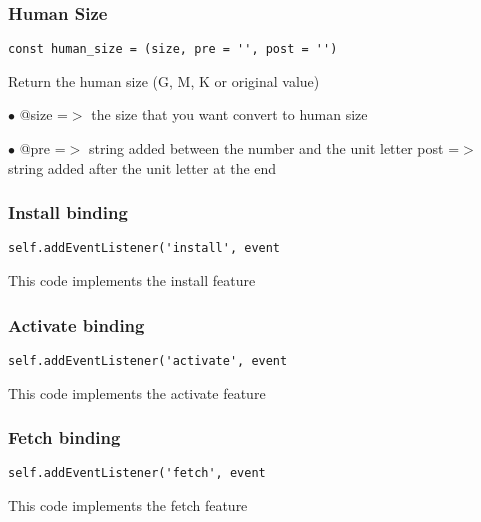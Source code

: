 \documentclass[a4paper]{article}
\begin{document}
\hypertarget{toc829}{}
\subsubsection{Human Size}

\begin{lstlisting}
const human_size = (size, pre = '', post = '')
\end{lstlisting}

Return the human size (G, M, K or original value)

\begin{compactitem}
\item[\color{myblue}$\bullet$] @size  =$>$ the size that you want convert to human size
\item[\color{myblue}$\bullet$] @pre  =$>$ string added between the number and the unit letter
post  =$>$ string added after the unit letter at the end
\end{compactitem}

\hypertarget{toc830}{}
\subsubsection{Install binding}

\begin{lstlisting}
self.addEventListener('install', event
\end{lstlisting}

This code implements the install feature

\hypertarget{toc831}{}
\subsubsection{Activate binding}

\begin{lstlisting}
self.addEventListener('activate', event
\end{lstlisting}

This code implements the activate feature

\hypertarget{toc832}{}
\subsubsection{Fetch binding}

\begin{lstlisting}
self.addEventListener('fetch', event
\end{lstlisting}

This code implements the fetch feature
\end{document}
